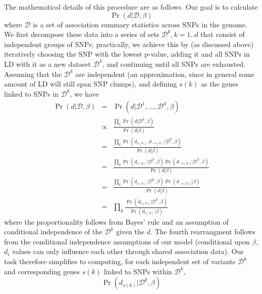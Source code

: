\documentclass[11pt]{article}
\begin{document}
The mathematical details of this procedure are as follows. Our goal is
to calculate
\[\Pr\left(d|\mathcal{D},\beta\right)\]
where $\mathcal{D}$ is a set of association summary statistics
across SNPs in the genome. We first decompose these data into a series
of sets $\mathcal{D}^k, k=1..d$ that consist of independent groups of
SNPs; practically, we achieve this by (as discussed above) iteratively
choosing the SNP with the lowest p-value, adding it and all SNPs in LD
with it as a new dataset $\mathcal{D}^k$, and continuing until all
SNPs are exhausted. Assuming that the $\mathcal{D}^k$ are independent
(an approximation, since in general some amount of LD will still span
SNP clumps), and defining $s(k)$ as the genes linked to SNPs in
$\mathcal{D}^k$, we have
\begin{eqnarray*}
  \Pr\left(d|\mathcal{D},\beta\right) &=&
  \Pr\left(d|\mathcal{D}^1,\ldots,\mathcal{D}^d,\beta\right) \\
  &\propto& \frac{\prod_k \Pr\left(d|\mathcal{D}^k,\beta\right)}{\Pr\left(d|\beta\right)} \\
  &=& \frac{\prod_k
    \Pr\left(d_{s(k)},d_{-s(k)}|\mathcal{D}^k,\beta\right)}{\Pr\left(d|\beta\right)} \\
  &=& \frac{\prod_k
    \Pr\left(d_{s(k)}|\mathcal{D}^k,\beta\right)\Pr\left(d_{-s(k)}|\mathcal{D}^k,\beta\right)}{\Pr\left(d|\beta\right)} \\
  &=& \frac{\prod_k
    \Pr\left(d_{s(k)}|\mathcal{D}^k,\beta\right)\Pr\left(d_{-s(k)}|\beta\right)}{\Pr\left(d|\beta\right)} \\
  &=& \prod_k
  \frac{\Pr\left(d_{s(k)}|\mathcal{D}^k,\beta\right)}{\Pr\left(d_{s(k)}|\beta\right)} \label{eq:combine_sig}
\end{eqnarray*}
where the proportionality follows from Bayes' rule and an assumption
of conditional independence of the $\mathcal{D}^k$ given the $d$. The
fourth rearrangment follows from the conditional independence
assumptions of our model (conditional upon $\beta$, $d_i$ values can
only influence each other through shared association data).
Our task therefore simplifies to computing, for each independent set of
variants $\mathcal{D}^k$ and corresponding genes $s(k)$ linked to SNPs
within $\mathcal{D}^k$,
\[  \Pr\left(d_{s(k)}|\mathcal{D}^k,\beta\right)\]
\end{document}

